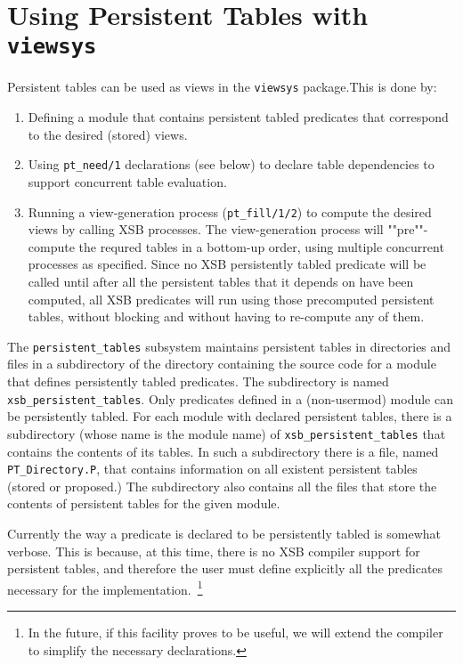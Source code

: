 
\section{Using Persistent Tables with {\tt viewsys}}

Persistent tables can be used as views in the {\tt viewsys}
package.This is done by:

\begin{enumerate}

\item Defining a module that contains persistent tabled predicates
that correspond to the desired (stored) views.

\item Using {\tt pt\_need/1} declarations (see below) to declare table
dependencies to support concurrent table evaluation.

\item Running a view-generation process ({\tt pt\_fill/1/2}) to
compute the desired views by calling XSB processes.  The
view-generation process will ""pre""-compute the requred tables in a
bottom-up order, using multiple concurrent processes as specified.
Since no XSB persistently tabled predicate will be called until after
all the persistent tables that it depends on have been computed, all
XSB predicates will run using those precomputed persistent tables,
without blocking and without having to re-compute any of them.

\end{enumerate}

The {\tt persistent\_tables} subsystem maintains persistent tables in
directories and files in a subdirectory of the directory containing
the source code for a module that defines persistently tabled
predicates.  The subdirectory is named {\tt xsb\_persistent\_tables}.
Only predicates defined in a (non-usermod) module can be persistently
tabled.  For each module with declared persistent tables, there is a
subdirectory (whose name is the module name) of
{\tt xsb\_persistent\_tables} that contains the contents of its
tables.  In such a subdirectory there is a file, named
{\tt PT\_Directory.P}, that contains information on all existent
persistent tables (stored or proposed.)  The subdirectory also
contains all the files that store the contents of persistent tables
for the given module.

Currently the way a predicate is declared to be persistently tabled is
somewhat verbose.  This is because, at this time, there is no XSB
compiler support for persistent tables, and therefore the user must
define explicitly all the predicates necessary for the
implementation.~\footnote{In the future, if this facility proves to be
  useful, we will extend the compiler to simplify the necessary
  declarations.}


